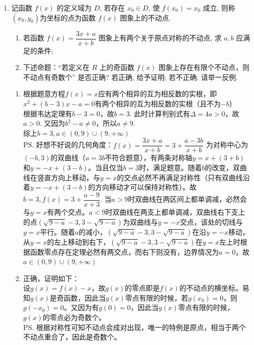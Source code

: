 \begin{enumerate}
\item 记函数 $f(x)$ 的定义域为 $D$, 若存在 $x_0 \in D$, 使 $f\left(x_0\right)=x_0$ 成立, 则称 $\left(x_0, y_0\right)$为坐标的点为函数 $f(x)$ 图象上的不动点.
\begin{enumerate}
    \item 若函数 $f(x)=\dfrac{3x+a}{x+b}$ 图象上有两个关于原点对称的不动点, 求 $a, b$ 应满足的条件;
    \item 下述命题：“若定义在 $R$ 上的奇函数 $f(x)$ 图象上存在有限个不动点，则不动点有奇数个” 是否正确? 若正确, 给予证明; 若不正确, 请举一反例.
\end{enumerate}
\begin{jieda}
    \begin{enumerate}
        \item 
        根据题意方程$f(x) = x$应有两个相异的互为相反数的实根，即$x^2 + (b-3)x - a = 0$有两个相异的互为相反数的实根（且不为$-b$）\\
        根据韦达定理有$b-3 = 0$，故$b = 3$. 此时计算判别式有$\Delta = 4a > 0$，故$a > 0$. 又因为$b^2 - a \neq 0$，所以$a \neq 9$.\\
        综上$b = 3, a \in (0, 9) \cup (9, +\infty)$
        \\
        \ps 好想不好说的几何角度：$f(x)=\dfrac{3x+a}{x+b} = 3 + \dfrac{a - 3b}{x+b}$ 为对称中心为$(-b, 3)$的双曲线（$a = 3b$不符合题意），有两条对称轴$y = x + (3+b)$和$y = -x + (3-b)$。当且仅当$b = 3$时，满足题意。随着$b$的改变，双曲线在竖直方向上移动，与$y = x$的交点必然不再满足对称性（只有双曲线沿着$y = -x + (3-b)$的方向移动才可以保持对称性）。故$b = 3, f(x) = 3 + \dfrac{a-9}{x+3}$. 当$a > 9$时双曲线在两区间上都单调减，必然会与$y = x$有两个交点。$a < 9$时双曲线在两支上都单调减，双曲线右下支上的点$(\sqrt{9-a}-3, 3-\sqrt{9-a})$为双曲线与$y = -x$交点，该处的切线与$y = x$平行。随着$a$的减小，$(\sqrt{9-a}-3, 3-\sqrt{9-a})$在沿$y = -x$移动，从$y = x$的左上移动到右下，$(\sqrt{9-a}-3, 3-\sqrt{9-a})$在$y = x$左上时根据函数零点存在定理必然有两交点，而右下则没有，边界情况为$a = 0$，故$a \in (0, 9) \cup (9, +\infty)$
        \item 正确，证明如下：\\
        设$g(x) = f(x) - x$，故$g(x)$的零点即是$f(x)$的不动点的横坐标。易知$g(x)$是奇函数，因此当$g(x)$零点有限的时候，若$g(x_0) = 0$，则$g(-x_0) = 0$。又因为有$g(0) = 0$，因此当$g(x)$零点有限的时候，$g(x)$的零点必为奇数个。 \\
        \ps 根据对称性可知不动点会成对出现，唯一的特例是原点，相当于两个不动点重合了，因此是奇数个。
    \end{enumerate}
\end{jieda}

\begin{vspace_}
   \vsp[5] 
\end{vspace_}
\end{enumerate}

